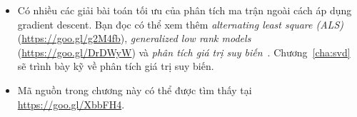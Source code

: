 \begin{itemize}
\item Có nhiều các giải bài toán tối ưu của phân tích ma trận ngoài cách áp dụng gradient descent. Bạn đọc có thể xem thêm
\textit{alternating least square (ALS)} (\url{https://goo.gl/g2M4fb}),
\textit{generalized low rank models} (\url{https://goo.gl/DrDWyW}) và
\textit{phân tích giá trị suy biến}~\cite{sarwar2002incremental,paterek2007improving}.
Chương~\ref{cha:svd} sẽ trình bày kỹ về phân tích giá trị suy biến.

\item Mã nguồn trong chương này có thể được tìm thấy tại \url{https://goo.gl/XbbFH4}.
\end{itemize}




